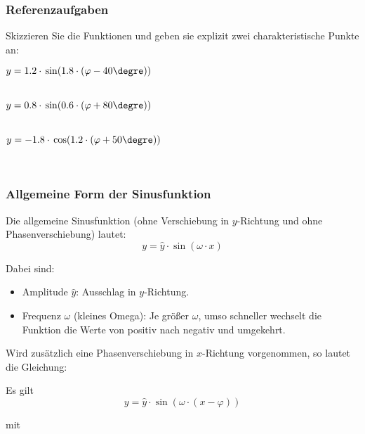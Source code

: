 {%

\subsubsection{Referenzaufgaben}

Skizzieren Sie die Funktionen und geben sie explizit zwei
charakteristische Punkte an:

$y = 1.2 \cdot{} \sin(1.8\cdot(\varphi-40\degre))$

\trigsysD{}\\

$y = 0.8 \cdot{} \sin(0.6\cdot{}(\varphi+80\degre))$

\trigsysD{}\\

$y = -1.8 \cdot{} \cos(1.2\cdot{}(\varphi+50\degre))$

\trigsysC{}\\


\newpage



\subsubsection{Allgemeine Form der Sinusfunktion}

Die allgemeine Sinusfunktion (ohne Verschiebung in $y$-Richtung und
ohne Phasenverschiebung) lautet:
$$y=\widehat{y}\cdot{}\sin(\omega\cdot{}x)$$

Dabei sind:
\begin{itemize}

\item
  Amplitude $\widehat{y}$: Ausschlag in $y$-Richtung.
\item
  Frequenz $\omega$ (kleines Omega): Je größer $\omega$, umso schneller wechselt die
  Funktion die Werte von positiv nach negativ und umgekehrt.
\end{itemize}

Wird zusätzlich eine Phasenverschiebung in $x$-Richtung vorgenommen, so lautet die Gleichung:

\begin{gesetz}{}{}
  Es gilt
  $$y=\widehat{y}\cdot{}\sin(\omega\cdot{}(x-\varphi))$$

mit
\begin{itemize}


\end{itemize}
\end{gesetz}}

